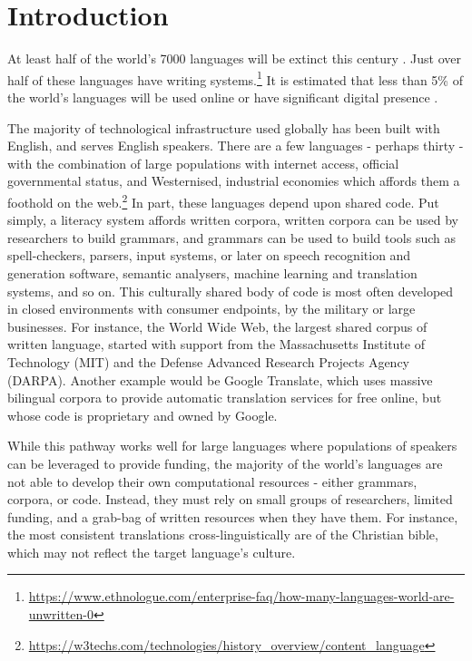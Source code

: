 \section{Introduction}\label{sec:intro}

At least half of the world's 7000 languages will be extinct this century \citep[p. 27]{grenoble_2011}. Just over half of these languages have writing systems.\footnote{\href{https://www.ethnologue.com/enterprise-faq/how-many-languages-world-are-unwritten-0}{https://www.ethnologue.com/enterprise-faq/how-many-languages-world-are-unwritten-0}} It is estimated that less than 5\% of the world's languages will be used online or have significant digital presence \citep{kornai2013digital}.

The majority of technological infrastructure used globally has been built with English, and serves English speakers. There are a few languages - perhaps thirty - with the combination of large populations with internet access, official governmental status, and Westernised, industrial economies which affords them a foothold on the web.\footnote{\href{https://w3techs.com/technologies/history\_overview/content\_language}{https://w3techs.com/technologies/history\_overview/content\_language}}
In part, these languages depend upon shared code. Put simply, a literacy system affords written corpora, written corpora can be used by researchers to build grammars, and grammars can be used to build tools such as spell-checkers, parsers, input systems, or later on speech recognition and generation software, semantic analysers, machine learning and translation systems, and so on.
This culturally shared body of code is most often developed in closed environments with consumer endpoints, by the military or large businesses. For instance, the World Wide Web, the largest shared corpus of written language, started with support from  the Massachusetts Institute of Technology (MIT) and the Defense Advanced Research Projects Agency (DARPA). Another example would be Google Translate, which uses massive bilingual corpora to provide automatic translation services for free online, but whose code is proprietary and owned by Google.

While this pathway works well for large languages where populations of speakers can be leveraged to provide funding, the majority of the world's languages are not able to develop their own computational resources - either grammars, corpora, or code. Instead, they must rely on small groups of researchers, limited funding, and a grab-bag of written resources when they have them. For instance, the most consistent translations cross-linguistically are of the Christian bible, which may not reflect the target language's culture.

